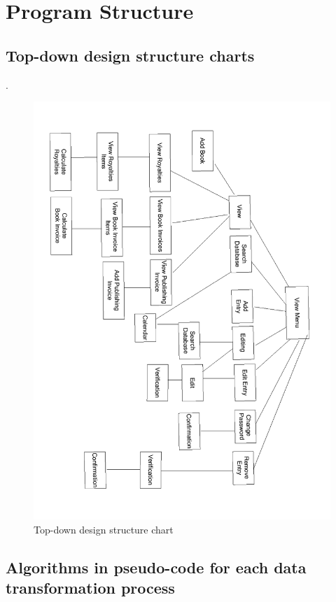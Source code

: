 \section{Program Structure}

\subsection{Top-down design structure charts}
.
\begin{figure}[H]
    \caption{Top-down design structure chart} \label{Top-down_design_structure_chart.pdf}
    \includegraphics[width=\textwidth]{./Design/Top-down_design_structure_chart.pdf}
\end{figure}

\subsection{Algorithms in pseudo-code for each data transformation process}

